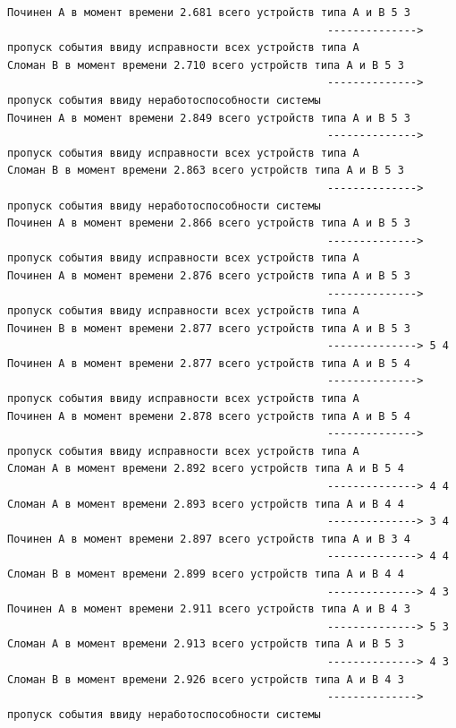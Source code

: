 \begin{verbatim}
Починен A в момент времени 2.681 всего устройств типа А и В 5 3
                                                  --------------> пропуск события ввиду исправности всех устройств типа А
Сломан B в момент времени 2.710 всего устройств типа А и В 5 3
                                                  --------------> пропуск события ввиду неработоспособности системы
Починен A в момент времени 2.849 всего устройств типа А и В 5 3
                                                  --------------> пропуск события ввиду исправности всех устройств типа А
Сломан B в момент времени 2.863 всего устройств типа А и В 5 3
                                                  --------------> пропуск события ввиду неработоспособности системы
Починен A в момент времени 2.866 всего устройств типа А и В 5 3
                                                  --------------> пропуск события ввиду исправности всех устройств типа А
Починен A в момент времени 2.876 всего устройств типа А и В 5 3
                                                  --------------> пропуск события ввиду исправности всех устройств типа А
Починен B в момент времени 2.877 всего устройств типа А и В 5 3
                                                  --------------> 5 4
Починен A в момент времени 2.877 всего устройств типа А и В 5 4
                                                  --------------> пропуск события ввиду исправности всех устройств типа А
Починен A в момент времени 2.878 всего устройств типа А и В 5 4
                                                  --------------> пропуск события ввиду исправности всех устройств типа А
Сломан A в момент времени 2.892 всего устройств типа А и В 5 4
                                                  --------------> 4 4
Сломан A в момент времени 2.893 всего устройств типа А и В 4 4
                                                  --------------> 3 4
Починен A в момент времени 2.897 всего устройств типа А и В 3 4
                                                  --------------> 4 4
Сломан B в момент времени 2.899 всего устройств типа А и В 4 4
                                                  --------------> 4 3
Починен A в момент времени 2.911 всего устройств типа А и В 4 3
                                                  --------------> 5 3
Сломан A в момент времени 2.913 всего устройств типа А и В 5 3
                                                  --------------> 4 3
Сломан B в момент времени 2.926 всего устройств типа А и В 4 3
                                                  --------------> пропуск события ввиду неработоспособности системы

\end{verbatim}
\normalsize

